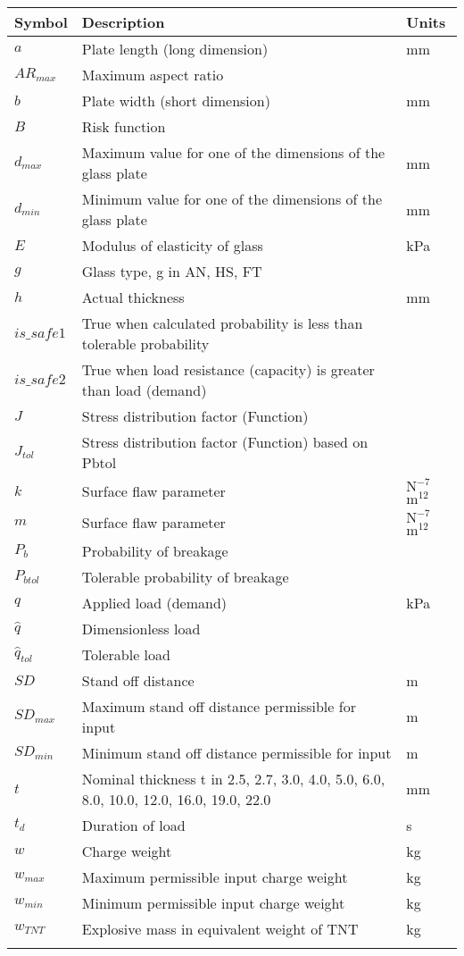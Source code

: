 \documentclass[12pt]{article}
\begin{document}
\begin{longtable*}{l l l}
\toprule
Symbol & Description & Units
\\
\midrule
$a$ & Plate length (long dimension) & mm
\\
$AR_{max}$ & Maximum aspect ratio & 
\\
$b$ & Plate width (short dimension) & mm
\\
$B$ & Risk function & 
\\
$d_{max}$ & Maximum value for one of the dimensions of the glass plate & mm
\\
$d_{min}$ & Minimum value for one of the dimensions of the glass plate & mm
\\
$E$ & Modulus of elasticity of glass & kPa
\\
$g$ & Glass type, g in {AN, HS, FT} & 
\\
$h$ & Actual thickness & mm
\\
$is\_safe1$ & True when calculated probability is less than tolerable probability & 
\\
$is\_safe2$ & True when load resistance (capacity) is greater than load (demand) & 
\\
$J$ & Stress distribution factor (Function) & 
\\
$J_{tol}$ & Stress distribution factor (Function) based on Pbtol & 
\\
$k$ & Surface flaw parameter & $\text{N}^{-7}$$\text{m}^{12}$
\\
$m$ & Surface flaw parameter & $\text{N}^{-7}$$\text{m}^{12}$
\\
$P_{b}$ & Probability of breakage & 
\\
$P_{btol}$ & Tolerable probability of breakage & 
\\
$q$ & Applied load (demand) & kPa
\\
$\hat{q}$ & Dimensionless load & 
\\
$\hat{q}_{tol}$ & Tolerable load & 
\\
$SD$ & Stand off distance & m
\\
$SD_{max}$ & Maximum stand off distance permissible for input & m
\\
$SD_{min}$ & Minimum stand off distance permissible for input & m
\\
$t$ & Nominal thickness t in {2.5, 2.7, 3.0, 4.0, 5.0, 6.0, 8.0, 10.0, 12.0, 16.0, 19.0, 22.0} & mm
\\
$t_{d}$ & Duration of load & s
\\
$w$ & Charge weight & kg
\\
$w_{max}$ & Maximum permissible input charge weight & kg
\\
$w_{min}$ & Minimum permissible input charge weight & kg
\\
$w_{TNT}$ & Explosive mass in equivalent weight of TNT & kg
\\
\bottomrule
\label{Table:ToS}
\end{longtable*}
\end{document}
